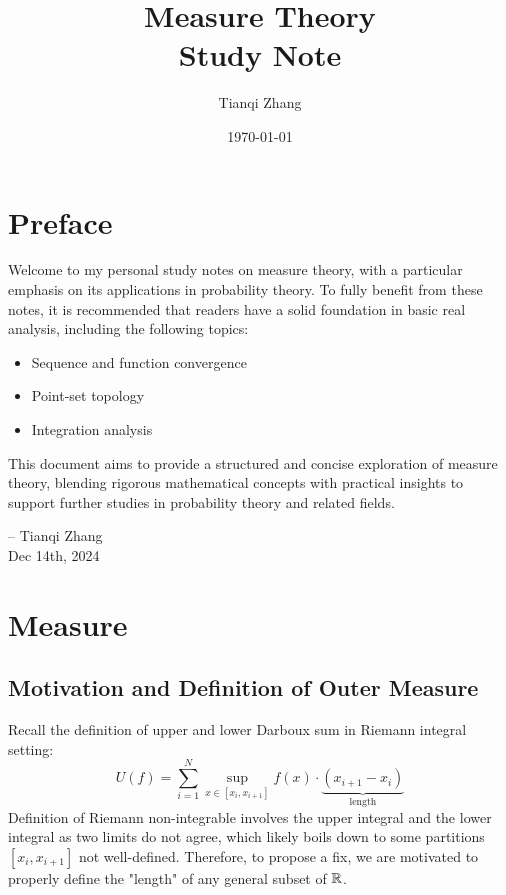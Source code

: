 

\title{\textbf{Measure Theory\\
               Study Note}}
\author{Tianqi Zhang}
\date{\today}


\maketitle

\tableofcontents

\newpage
\section{Preface}
Welcome to my personal study notes on measure theory, with a particular emphasis on its applications in probability theory. To fully benefit from these notes, it is recommended that readers have a solid foundation in basic real analysis, including the following topics:
\begin{itemize}
    \item Sequence and function convergence
    \item Point-set topology
    \item Integration analysis
\end{itemize}
This document aims to provide a structured and concise exploration of measure theory, blending rigorous mathematical concepts with practical insights to support further studies in probability theory and related fields.


\begin{flushright}
-- Tianqi Zhang\\
Dec 14th, 2024
\end{flushright}


\newpage
\section{Measure}

\subsection{Motivation and Definition of Outer Measure}
Recall the definition of upper and lower Darboux sum in Riemann integral setting: 
$$U(f) = \sum_{i=1}^N \sup_{x\in [x_i, x_{i+1}]}{f(x)} \cdot \underbrace{(x_{i+1} - x_i)}_{\text{length}}$$
Definition of Riemann non-integrable involves the upper integral and the lower integral as two limits do not agree, which likely boils down to some partitions $[x_i, x_{i+1}]$ not well-defined. Therefore, to propose a fix, we are motivated to properly define the "length" of any general subset of ${\mathbb{R}}$. \\

